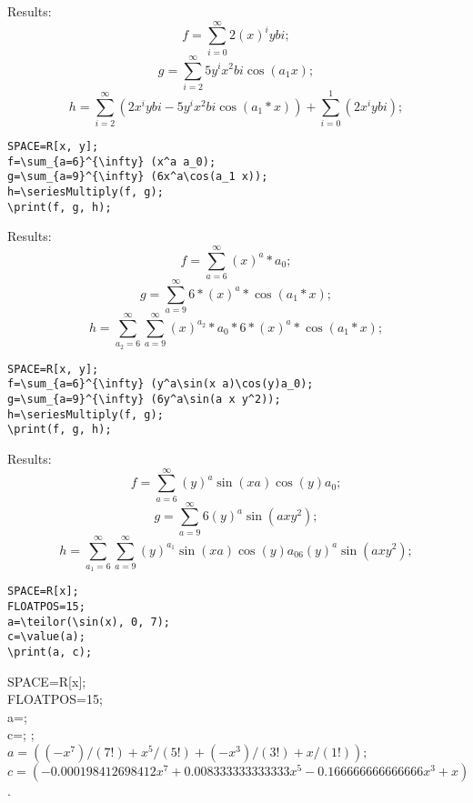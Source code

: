 Results:\\
$$f = \sum_{i=0}^{\infty} 2(x)^iybi;$$
$$g = \sum_{i=2}^{\infty} 5y^ix^2bi\cos(a_1x);$$
$$h = \sum_{i=2}^{\infty} (2x^iybi-5y^ix^2bi\cos(a_1*x))+\sum_{i=0}^{1}(2x^iybi);$$
\begin{verbatim}
SPACE=R[x, y];
f=\sum_{a=6}^{\infty} (x^a a_0);
g=\sum_{a=9}^{\infty} (6x^a\cos(a_1 x));
h=\seriesMultiply(f, g); 
\print(f, g, h);
\end{verbatim} 

Results:\\
$$f = \sum_{a=6}^{\infty} (x)^a*a_0;$$
$$g = \sum_{a=9}^{\infty} 6*(x)^a*\cos(a_1*x);$$
$$h = \sum_{a_2=6}^{\infty} \sum_{a=9}^{\infty} (x)^{a_2}*a_0*6*(x)^a*\cos(a_1*x);$$
\begin{verbatim}
SPACE=R[x, y];
f=\sum_{a=6}^{\infty} (y^a\sin(x a)\cos(y)a_0);
g=\sum_{a=9}^{\infty} (6y^a\sin(a x y^2));
h=\seriesMultiply(f, g); 
\print(f, g, h);
\end{verbatim}

Results:\\
$$f = \sum_{a=6}^{\infty} (y)^a\sin(xa)\cos(y)a_0;$$
$$g = \sum_{a=9}^{\infty} 6(y)^a\sin(axy^2);$$
$$h = \sum_{a_1=6}^{\infty} \sum_{a=9}^{\infty} (y)^{a_1}\sin(xa)\cos(y)a_06(y)^a\sin(axy^2);$$
\begin{verbatim}
SPACE=R[x]; 
FLOATPOS=15;
a=\teilor(\sin(x), 0, 7);
c=\value(a); 
\print(a, c);
\end{verbatim} 

\ex  
  { SPACE=R[x]; \\
  FLOATPOS=15; \\
   a=;  \\ 
   c=; 
; }   
 { \\
 $a = ((-x^{7})/(7\mathbf{}!)+x^{5}/(5\mathbf{}!)+(-x^{3})/(3\mathbf{}!)+x/(1\mathbf{}!)); $\\
 $c = (-0. 000198412698412x^{7}+0. 008333333333333x^{5}-0. 166666666666666x^{3}+x)$.  
  }
